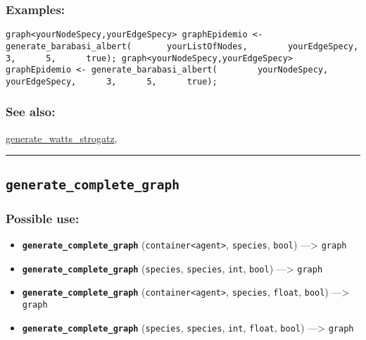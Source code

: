 \documentclass[]{book}
\providecommand{\tightlist}{%
  \setlength{\itemsep}{0pt}\setlength{\parskip}{0pt}}
\theoremstyle{definition}
\theoremstyle{definition}
\theoremstyle{definition}
\theoremstyle{remark}
\begin{document}
\subsubsection{Examples:}\label{examples-136}

\begin{verbatim}
graph<yourNodeSpecy,yourEdgeSpecy> graphEpidemio <- generate_barabasi_albert(       yourListOfNodes,        yourEdgeSpecy,      3,      5,      true); graph<yourNodeSpecy,yourEdgeSpecy> graphEpidemio <- generate_barabasi_albert(        yourNodeSpecy,      yourEdgeSpecy,      3,      5,      true); 
\end{verbatim}

\subsubsection{See also:}\label{see-also-103}

\href{OperatorsDH\#generate_watts_strogatz}{generate\_watts\_strogatz},

\begin{center}\rule{0.5\linewidth}{\linethickness}\end{center}

\subsection{\texorpdfstring{\texttt{generate\_complete\_graph}}{generate\_complete\_graph}}\label{generate_complete_graph}

\subsubsection{Possible use:}\label{possible-use-187}

\begin{itemize}
\tightlist
\item
  \textbf{\texttt{generate\_complete\_graph}}
  (\texttt{container\textless{}agent\textgreater{}}, \texttt{species},
  \texttt{bool}) ---\textgreater{} \texttt{graph}
\item
  \textbf{\texttt{generate\_complete\_graph}} (\texttt{species},
  \texttt{species}, \texttt{int}, \texttt{bool}) ---\textgreater{}
  \texttt{graph}
\item
  \textbf{\texttt{generate\_complete\_graph}}
  (\texttt{container\textless{}agent\textgreater{}}, \texttt{species},
  \texttt{float}, \texttt{bool}) ---\textgreater{} \texttt{graph}
\item
  \textbf{\texttt{generate\_complete\_graph}} (\texttt{species},
  \texttt{species}, \texttt{int}, \texttt{float}, \texttt{bool})
  ---\textgreater{} \texttt{graph}
\end{itemize}
\end{document}
